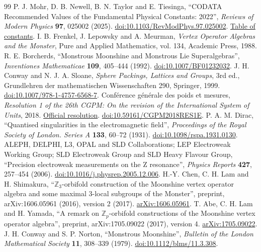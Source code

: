 \begin{thebibliography}{99}
 P. J. Mohr, D. B. Newell, B. N. Taylor and E. Tiesinga, ``CODATA Recommended Values of the Fundamental Physical Constants: 2022'', \emph{Reviews of Modern Physics} \textbf{97}, 025002 (2025). \href{https://doi.org/10.1103/RevModPhys.97.025002}{doi:10.1103/RevModPhys.97.025002}. \href{https://physics.nist.gov/cuu/Constants/Table/allascii.txt}{Table of constants}.
 I. B. Frenkel, J. Lepowsky and A. Meurman, \emph{Vertex Operator Algebras and the Monster}, Pure and Applied Mathematics, vol. 134, Academic Press, 1988.
 R. E. Borcherds, ``Monstrous Moonshine and Monstrous Lie Superalgebras'', \emph{Inventiones Mathematicae} \textbf{109}, 405--444 (1992). \href{https://doi.org/10.1007/BF01232032}{doi:10.1007/BF01232032}.
 J. H. Conway and N. J. A. Sloane, \emph{Sphere Packings, Lattices and Groups}, 3rd ed., Grundlehren der mathematischen Wissenschaften 290, Springer, 1999. \href{https://doi.org/10.1007/978-1-4757-6568-7}{doi:10.1007/978-1-4757-6568-7}.
 Conférence générale des poids et mesures, \emph{Resolution 1 of the 26th CGPM: On the revision of the International System of Units}, 2018. \href{https://www.bipm.org/en/committees/cg/cgpm/26-2018/resolution-1}{Official resolution}. \href{https://doi.org/10.59161/CGPM2018RES1E}{doi:10.59161/CGPM2018RES1E}.
 P. A. M. Dirac, ``Quantised singularities in the electromagnetic field'', \emph{Proceedings of the Royal Society of London. Series A} \textbf{133}, 60--72 (1931). \href{https://doi.org/10.1098/rspa.1931.0130}{doi:10.1098/rspa.1931.0130}.
 ALEPH, DELPHI, L3, OPAL and SLD Collaborations; LEP Electroweak Working Group; SLD Electroweak Group and SLD Heavy Flavour Group, ``Precision electroweak measurements on the Z resonance'', \emph{Physics Reports} \textbf{427}, 257--454 (2006). \href{https://doi.org/10.1016/j.physrep.2005.12.006}{doi:10.1016/j.physrep.2005.12.006}.
 H.-Y. Chen, C. H. Lam and H. Shimakura, ``\(\mathbb Z_3\)-orbifold construction of the Moonshine vertex operator algebra and some maximal \(3\)-local subgroups of the Monster'', preprint, arXiv:1606.05961 (2016), version 2 (2017). \href{https://arxiv.org/abs/1606.05961}{arXiv:1606.05961}.
 T. Abe, C. H. Lam and H. Yamada, ``A remark on \(\mathbb Z_p\)-orbifold constructions of the Moonshine vertex operator algebra'', preprint, arXiv:1705.09022 (2017), version 4. \href{https://arxiv.org/abs/1705.09022v4}{arXiv:1705.09022}.
 J. H. Conway and S. P. Norton, ``Monstrous Moonshine'', \emph{Bulletin of the London Mathematical Society} \textbf{11}, 308--339 (1979). \href{https://doi.org/10.1112/blms/11.3.308}{doi:10.1112/blms/11.3.308}.

\end{thebibliography}
